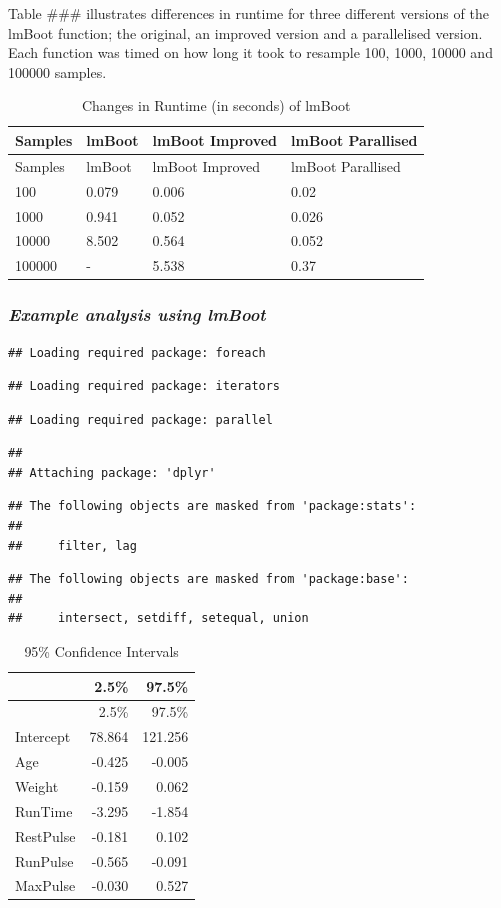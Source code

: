 \documentclass[]{article}
\begin{document}
Table \#\#\# illustrates differences in runtime for three different
versions of the lmBoot function; the original, an improved version and a
parallelised version. Each function was timed on how long it took to
resample 100, 1000, 10000 and 100000 samples.

\begin{longtable}[]{@{}llll@{}}
\caption{Changes in Runtime (in seconds) of lmBoot}\tabularnewline
\toprule
Samples & lmBoot & lmBoot Improved & lmBoot Parallised\tabularnewline
\midrule
\endfirsthead
\toprule
Samples & lmBoot & lmBoot Improved & lmBoot Parallised\tabularnewline
\midrule
\endhead
100 & 0.079 & 0.006 & 0.02\tabularnewline
1000 & 0.941 & 0.052 & 0.026\tabularnewline
10000 & 8.502 & 0.564 & 0.052\tabularnewline
100000 & - & 5.538 & 0.37\tabularnewline
\bottomrule
\end{longtable}

\subsubsection{\texorpdfstring{\emph{Example analysis using
lmBoot}}{Example analysis using lmBoot}}\label{example-analysis-using-lmboot}

\begin{verbatim}
## Loading required package: foreach
\end{verbatim}

\begin{verbatim}
## Loading required package: iterators
\end{verbatim}

\begin{verbatim}
## Loading required package: parallel
\end{verbatim}

\begin{verbatim}
## 
## Attaching package: 'dplyr'
\end{verbatim}

\begin{verbatim}
## The following objects are masked from 'package:stats':
## 
##     filter, lag
\end{verbatim}

\begin{verbatim}
## The following objects are masked from 'package:base':
## 
##     intersect, setdiff, setequal, union
\end{verbatim}

\begin{longtable}[]{@{}lrr@{}}
\caption{95\% Confidence Intervals}\tabularnewline
\toprule
& 2.5\% & 97.5\%\tabularnewline
\midrule
\endfirsthead
\toprule
& 2.5\% & 97.5\%\tabularnewline
\midrule
\endhead
Intercept & 78.864 & 121.256\tabularnewline
Age & -0.425 & -0.005\tabularnewline
Weight & -0.159 & 0.062\tabularnewline
RunTime & -3.295 & -1.854\tabularnewline
RestPulse & -0.181 & 0.102\tabularnewline
RunPulse & -0.565 & -0.091\tabularnewline
MaxPulse & -0.030 & 0.527\tabularnewline
\bottomrule
\end{longtable}
\end{document}

